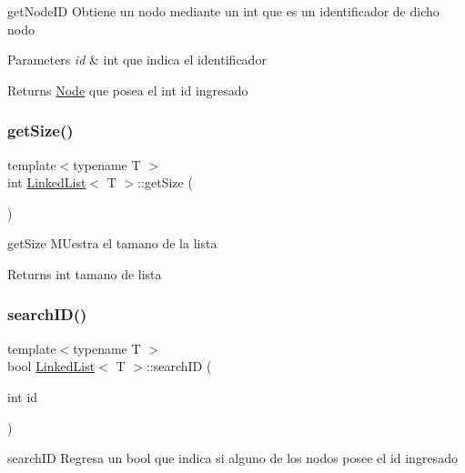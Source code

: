 get\+Node\+ID Obtiene un nodo mediante un int que es un identificador de dicho nodo 


\begin{DoxyParams}{Parameters}
{\em id} & int que indica el identificador \\
\hline
\end{DoxyParams}
\begin{DoxyReturn}{Returns}
\hyperlink{class_node}{Node} que posea el int id ingresado 
\end{DoxyReturn}
\mbox{\label{class_linked_list_ab56d59b74c8d24cd223a4a49a2b5cfb1}} 
\subsubsection{\texorpdfstring{get\+Size()}{getSize()}}
{\footnotesize\ttfamily template$<$typename T $>$ \\
int \hyperlink{class_linked_list}{Linked\+List}$<$ T $>$\+::get\+Size (\begin{DoxyParamCaption}{ }\end{DoxyParamCaption})}



get\+Size M\+Uestra el tamano de la lista 

\begin{DoxyReturn}{Returns}
int tamano de lista 
\end{DoxyReturn}
\mbox{\label{class_linked_list_ab607f61fa0222605f6f6dd794555e592}} 
\subsubsection{\texorpdfstring{search\+I\+D()}{searchID()}}
{\footnotesize\ttfamily template$<$typename T $>$ \\
bool \hyperlink{class_linked_list}{Linked\+List}$<$ T $>$\+::search\+ID (\begin{DoxyParamCaption}\item[{int}]{id }\end{DoxyParamCaption})}



search\+ID Regresa un bool que indica si alguno de los nodos posee el id ingresado 


